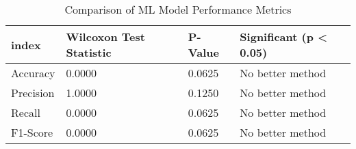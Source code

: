 \begin{table}[htbp]
\caption{Comparison of ML Model Performance Metrics}
\label{tab:model_comparison}
\begin{tabular}{llll}
\toprule
index & Wilcoxon Test Statistic & P-Value & Significant (p < 0.05) \\
\midrule
Accuracy & 0.0000 & 0.0625 & No better method \\
Precision & 1.0000 & 0.1250 & No better method \\
Recall & 0.0000 & 0.0625 & No better method \\
F1-Score & 0.0000 & 0.0625 & No better method \\
\bottomrule
\end{tabular}
\end{table}
